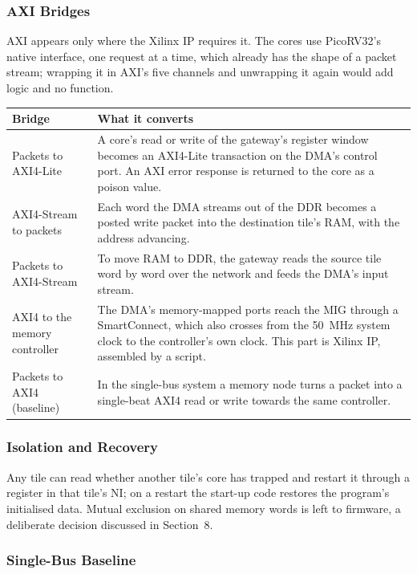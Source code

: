 \documentclass[11pt,a4paper]{article}
\begin{document}
\subsubsection{AXI Bridges}

AXI appears only where the Xilinx IP requires it. The cores use PicoRV32's
native interface, one request at a time, which already has the shape of a
packet stream; wrapping it in AXI's five channels and unwrapping it again
would add logic and no function.

\begin{tabularx}{\textwidth}{@{}lY@{}}
\toprule
\textbf{Bridge} & \textbf{What it converts} \\
\midrule
Packets to AXI4-Lite & A core's read or write of the gateway's register
window becomes an AXI4-Lite transaction on the DMA's control port. An AXI
error response is returned to the core as a poison value. \\
AXI4-Stream to packets & Each word the DMA streams out of the DDR becomes a
posted write packet into the destination tile's RAM, with the address
advancing. \\
Packets to AXI4-Stream & To move RAM to DDR, the gateway reads the source
tile word by word over the network and feeds the DMA's input stream. \\
AXI4 to the memory controller & The DMA's memory-mapped ports reach the MIG
through a SmartConnect, which also crosses from the 50~MHz system clock to
the controller's own clock. This part is Xilinx IP, assembled by a script. \\
Packets to AXI4 (baseline) & In the single-bus system a memory node turns a
packet into a single-beat AXI4 read or write towards the same controller. \\
\bottomrule
\end{tabularx}

\subsubsection{Isolation and Recovery}

Any tile can read whether another tile's core has trapped and restart it
through a register in that tile's NI; on a restart the start-up code restores
the program's initialised data. Mutual exclusion on shared memory words is
left to firmware, a deliberate decision discussed in Section~8.

\subsubsection{Single-Bus Baseline}
\end{document}
